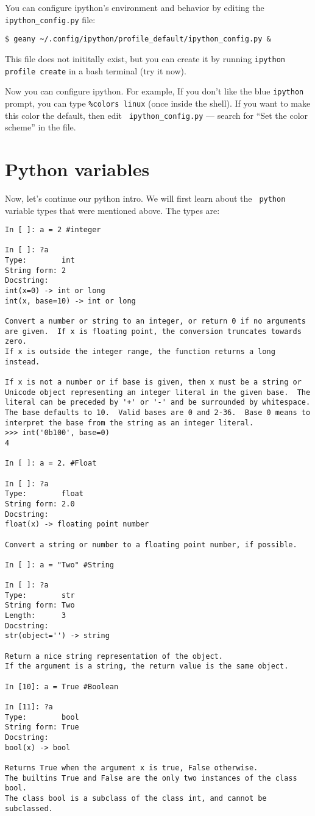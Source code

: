 \begin{tipbox}
You can configure ipython's environment and behavior by editing 
the {\tt ipython\_config.py} file:
\begin{lstlisting}
$ geany ~/.config/ipython/profile_default/ipython_config.py &
\end{lstlisting}
This file does not inititally exist, but you can create it by running  
{\tt ipython profile create} in a bash terminal (try it now). 

Now you can configure ipython. For example, If you don't like the blue 
{\tt ipython} prompt, you can type {\tt \%colors linux} (once inside 
the shell). If you want to make this color the default, then edit {\tt 
ipython\_config.py} --- search for ``Set the color scheme'' in the 
file. 
\end{tipbox}
\section{Python variables}

Now, let's continue our python intro. We will first learn about the {\tt 
python} variable types that were mentioned above. The types are:

\begin{lstlisting}
In [ ]: a = 2 #integer

In [ ]: ?a
Type:        int
String form: 2
Docstring:
int(x=0) -> int or long
int(x, base=10) -> int or long

Convert a number or string to an integer, or return 0 if no arguments
are given.  If x is floating point, the conversion truncates towards zero.
If x is outside the integer range, the function returns a long instead.

If x is not a number or if base is given, then x must be a string or
Unicode object representing an integer literal in the given base.  The
literal can be preceded by '+' or '-' and be surrounded by whitespace.
The base defaults to 10.  Valid bases are 0 and 2-36.  Base 0 means to
interpret the base from the string as an integer literal.
>>> int('0b100', base=0)
4

In [ ]: a = 2. #Float

In [ ]: ?a
Type:        float
String form: 2.0
Docstring:
float(x) -> floating point number

Convert a string or number to a floating point number, if possible.

In [ ]: a = "Two" #String

In [ ]: ?a
Type:        str
String form: Two
Length:      3
Docstring:
str(object='') -> string

Return a nice string representation of the object.
If the argument is a string, the return value is the same object.

In [10]: a = True #Boolean

In [11]: ?a
Type:        bool
String form: True
Docstring:
bool(x) -> bool

Returns True when the argument x is true, False otherwise.
The builtins True and False are the only two instances of the class bool.
The class bool is a subclass of the class int, and cannot be subclassed.
\end{lstlisting}

